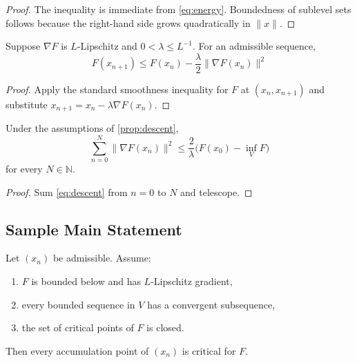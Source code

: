 \begin{proof}
The inequality is immediate from \cref{eq:energy}. Boundedness of sublevel sets follows because the right-hand side grows quadratically in $\|x\|$.
\end{proof}

\begin{proposition}
\label{prop:descent}
Suppose $\nabla F$ is $L$-Lipschitz and $0<\lambda\le L^{-1}$. For an admissible sequence,
\begin{equation}
\label{eq:descent}
F(x_{n+1})\le F(x_n)-\frac{\lambda}{2}\|\nabla F(x_n)\|^2
\end{equation}
\end{proposition}

\begin{proof}
Apply the standard smoothness inequality for $F$ at $(x_n,x_{n+1})$ and substitute $x_{n+1}=x_n-\lambda\nabla F(x_n)$.
\end{proof}

\begin{corollary}
\label{cor:grad-summable}
Under the assumptions of \cref{prop:descent},
\[
\sum_{n=0}^{N}\|\nabla F(x_n)\|^2
\le \frac{2}{\lambda}\bigl(F(x_0)-\inf_V F\bigr)
\]
for every $N\in\mathbb{N}$.
\end{corollary}

\begin{proof}
Sum \cref{eq:descent} from $n=0$ to $N$ and telescope.
\end{proof}

\subsection{Sample Main Statement}
\label{ssec:main-statement}

\begin{theorem}
\label{thm:template-convergence}
Let $(x_n)$ be admissible. Assume:
\begin{enumerate}
    \item $F$ is bounded below and has $L$-Lipschitz gradient,
    \item every bounded sequence in $V$ has a convergent subsequence,
    \item the set of critical points of $F$ is closed.
\end{enumerate}
Then every accumulation point of $(x_n)$ is critical for $F$.
\end{theorem}

